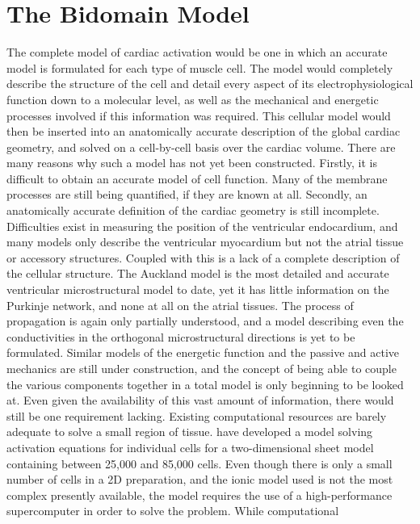 \section{The Bidomain Model}
\label{sec:bidomain-model}

The complete model of cardiac activation would be one in which an
accurate model is formulated for each type of muscle cell.  The model
would completely describe the structure of the cell and detail every
aspect of its electrophysiological function down to a molecular level,
as well as the mechanical and energetic processes involved if this
information was required.  This cellular model would then be inserted
into an anatomically accurate description of the global cardiac
geometry, and solved on a cell-by-cell basis over the cardiac volume.
There are many reasons why such a model has not yet been constructed.
Firstly, it is difficult to obtain an accurate model of cell function.
Many of the membrane processes are still being quantified, if they are
known at all.  Secondly, an anatomically accurate definition of the
cardiac geometry is still incomplete.  Difficulties exist in measuring
the position of the ventricular endocardium, and many models only
describe the ventricular myocardium but not the atrial tissue or
accessory structures.  Coupled with this is a lack of a complete
description of the cellular structure.  The Auckland model is the most
detailed and accurate ventricular microstructural model to date, yet
it has little information on the Purkinje network, and none at all on
the atrial tissues.  The process of propagation is again only
partially understood, and a model describing even the conductivities
in the orthogonal microstructural directions is yet to be formulated.
Similar models of the energetic function and the passive and active
mechanics are still under construction, and the concept of being able
to couple the various components together in a total model is only
beginning to be looked at.  Even given the availability of this vast
amount of information, there would still be one requirement lacking.
Existing computational resources are barely adequate to solve a small
region of tissue.  \citet{spach:pilkington:1993} have developed a
model solving activation equations for individual cells for a
two-dimensional sheet model containing between 25,000 and 85,000
cells.  Even though there is only a small number of cells in a 2D
preparation, and the ionic model used is not the most complex
presently available, the model requires the use of a high-performance
supercomputer in order to solve the problem.  While computational
